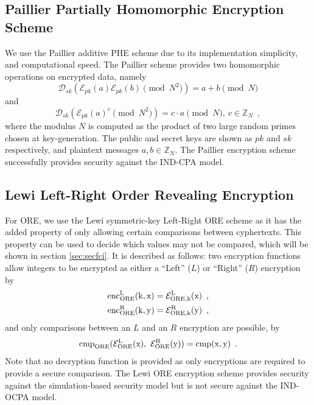 \documentclass[letterpaper, 10 pt, conference]{ieeeconf}  %
\begin{document}
\subsection{Paillier Partially Homomorphic Encryption Scheme} \label{subsec:paillier}
We use the Paillier additive PHE scheme due to its implementation simplicity, and computational speed. The Paillier scheme provides two homomorphic operations on encrypted data, namely
\begin{equation}
   \mathcal{D}_{sk}(\mathcal{E}_{pk}(a)\mathcal{E}_{pk}(b) \!\!\pmod{N^{2}}) = a + b \!\!\pmod{N} \label{eqn:paillier_add}
\end{equation}
and
\begin{equation}
   \mathcal{D}_{sk}(\mathcal{E}_{pk}(a)^c \!\!\pmod{N^{2}}) = c\cdot a \!\!\pmod{N},\ c \in \mathbb{Z}_N\enspace, \label{eqn:paillier_mult}
\end{equation}
where the modulus $N$ is computed as the product of two large random primes chosen at key-generation. The public and secret keys are shown as $pk$ and $sk$ respectively, and plaintext messages $a,b \in \mathbb{Z}_N$. The Paillier encryption scheme successfully provides security against the IND-CPA model.

\subsection{Lewi Left-Right Order Revealing Encryption} \label{subsec:lewi}
For ORE, we use the Lewi symmetric-key Left-Right ORE scheme as it has the added property of only allowing certain comparisons between cyphertexts. This property can be used to decide which values may not be compared, which will be shown in section \ref{sec:secfci}. It is described as follows: two encryption functions allow integers to be encrypted as either a ``Left'' ($L$) or ``Right'' ($R$) encryption by
\begin{equation}
   \begin{aligned} \label{eqn:lewi_l_r}
      &\operatorfont{enc}^L_{ORE}(k, x) = \mathcal{E}^L_{ORE,k}(x)\enspace, \\
      &\operatorfont{enc}^R_{ORE}(k, y) = \mathcal{E}^R_{ORE,k}(y)\enspace,
   \end{aligned}
\end{equation}
and only comparisons between an $L$ and an $R$ encryption are possible, by
\begin{equation}
   \operatorfont{cmp}_{ORE}(\mathcal{E}^L_{ORE}(x),\ \mathcal{E}^R_{ORE}(y)) = \operatorfont{cmp}(x, y)\enspace. \label{eqn:lewi_cmp}
\end{equation}
Note that no decryption function is provided as only encryptions are required to provide a secure comparison. The Lewi ORE encryption scheme provides security against the simulation-based security model \cite{chenettePracticalOrderRevealingEncryption2016} but is not secure against the IND-OCPA model.
\end{document}
